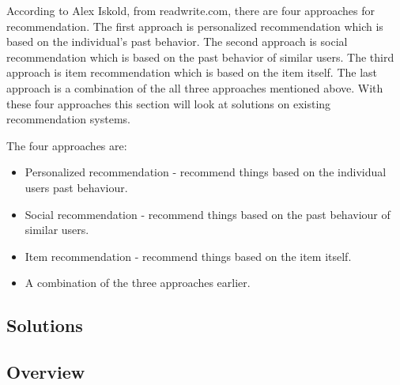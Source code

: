 According to Alex Iskold, from readwrite.com, there are four approaches for recommendation. The first approach is personalized recommendation which is based on the individual’s past behavior. The second approach is social recommendation which is based on the past behavior of similar users. The third approach is item recommendation which is based on the item itself. The last approach is a combination of the all three approaches mentioned above. With these four approaches this section will look at solutions on existing recommendation systems. \cite{ReadWrite}


The four approaches are:

\begin{itemize}
	\item Personalized recommendation - recommend things based on the individual users past behaviour. 
	\item Social recommendation - recommend things based on the past behaviour of similar users. 
	\item Item recommendation - recommend things based on the item itself.
	\item A combination of the three approaches earlier.
\end{itemize}

\subsection{Solutions}
\label{Solutions}

\subsection{Overview}
\label{SolutionOverview}
